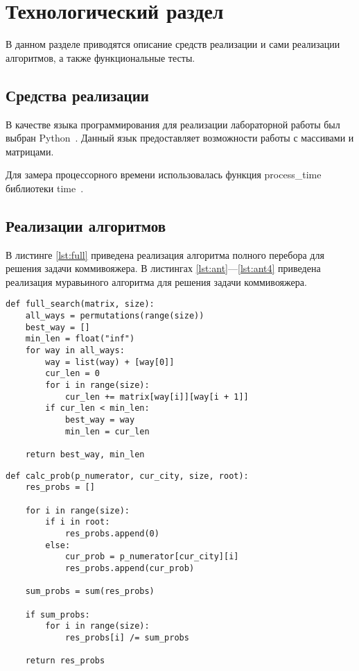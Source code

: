 \section{Технологический раздел \hfill}
\vspace{\baselineskip}

В данном разделе приводятся описание средств реализации и сами реализации алгоритмов, а также функциональные тесты.

\vspace{\baselineskip}
\subsection{Средства реализации}
\vspace{\baselineskip}

В качестве языка программирования для реализации лабораторной работы был выбран Python~\cite{PythonBook}. 
Данный язык предоставляет возможности работы с массивами и матрицами.

Для замера процессорного времени использовалась функция process\_time библиотеки time~\cite{process_time_text}.

\vspace{\baselineskip}
\subsection{Реализации алгоритмов}
\vspace{\baselineskip}

В листинге \ref{lst:full} приведена реализация алгоритма полного перебора для решения задачи коммивояжера.
В листингах \ref{lst:ant}---\ref{lst:ant4} приведена реализация муравьиного алгоритма для решения задачи коммивояжера.
\clearpage

\begin{lstlisting}[label=lst:full, caption=Реализация алгоритма полного перебора]
def full_search(matrix, size):
    all_ways = permutations(range(size))
    best_way = []
    min_len = float("inf")
    for way in all_ways:
        way = list(way) + [way[0]]
        cur_len = 0
        for i in range(size):
            cur_len += matrix[way[i]][way[i + 1]]
        if cur_len < min_len:
            best_way = way
            min_len = cur_len

    return best_way, min_len
\end{lstlisting}

\clearpage

\begin{lstlisting}[label=lst:ant, caption=Вычисление вероятностей перехода в следующий город]
def calc_prob(p_numerator, cur_city, size, root):
    res_probs = []

    for i in range(size):
        if i in root:
            res_probs.append(0)
        else:
            cur_prob = p_numerator[cur_city][i]
            res_probs.append(cur_prob)

    sum_probs = sum(res_probs)

    if sum_probs:
        for i in range(size):
            res_probs[i] /= sum_probs

    return res_probs
\end{lstlisting}

